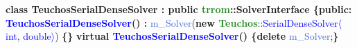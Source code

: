             \newline\textbf{class \textcolor{Melon}{TeuchosSerialDenseSolver} : public \textcolor{ForestGreen}{trrom}::\textcolor{Melon}{SolverInterface} \{}\newline\textbf{public:}\newline
        \tab\textbf{\textcolor{blue}{TeuchosSerialDenseSolver}() : }\newline\tab\tab\textcolor{RoyalBlue}{m\_Solver}(\textbf{new \textcolor{ForestGreen}{Teuchos}}::\textcolor{blue}{SerialDenseSolver$\langle$int, double$\rangle$}) \textbf{\{\}}\newline
        \tab\textbf{virtual \textcolor{blue}{\detokenize{~}TeuchosSerialDenseSolver}() \{\textbf{delete}} \textcolor{RoyalBlue}{m\_Solver};\textbf{\}}\newline\newline
